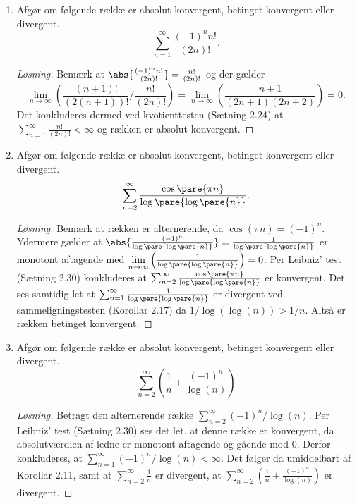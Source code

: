 \setcounter{section}{2}
\begin{opg}\hfill
\begin{enumerate}
    \item Afgør om følgende række er absolut konvergent, betinget konvergent eller divergent.
    $$ \sum_{n=1}^\infty \frac{(-1)^n n! }{(2n)!}. $$
    \ifanswers
    \begin{proof}[Løsning]
    	Bemærk at $ \abs{\frac{(-1)^n n! }{(2n)!}}=\frac{ n! }{(2n)!} $ og der gælder \begin{equation*}
    	\lim\limits_{n\to\infty}\left(\frac{ (n+1)! }{(2(n+1))!}\Bigg/\frac{ n! }{(2n)!}\right)=\lim\limits_{n\to\infty}\left(\frac{n+1}{(2n+1)(2n+2)}\right)=0.
    	\end{equation*}
    	Det konkluderes dermed ved kvotienttesten (Sætning 2.24) at $ \sum_{n=1}^\infty \frac{ n! }{(2n)!}<\infty $ og rækken er absolut konvergent.
    \end{proof}
    \fi
    
    \item Afgør om følgende række er absolut konvergent, betinget konvergent eller divergent.
    $$ \sum_{n=2}^\infty
        \frac{\cos\pare{\pi n}}{\log\pare{\log\pare{n}}}.  $$
        \ifanswers
        \begin{proof}[Løsning]
        	Bemærk at rækken er alternerende, da $ \cos(\pi n)=(-1)^n $.
        	Ydermere gælder at $ \abs{\frac{(-1)^n}{\log\pare{\log\pare{n}}}}=\frac{1}{\log\pare{\log\pare{n}}} $ er monotont aftagende med $\lim\limits_{n\to\infty}\left(\frac{1}{\log\pare{\log\pare{n}}}\right)= 0 $. Per Leibniz' test (Sætning 2.30) konkluderes at $ \sum_{n=2}^\infty
        	\frac{\cos\pare{\pi n}}{\log\pare{\log\pare{n}}} $ er konvergent. Det ses samtidig let at $ \sum_{n=1}^{\infty}\frac{1}{\log\pare{\log\pare{n}}} $ er divergent ved sammeligningstesten (Korollar 2.17) da $ 1/\log(\log(n))>1/n $. Altså er rækken betinget konvergent.
        \end{proof}
        \fi
    \item Afgør om følgende række er absolut konvergent, betinget konvergent eller divergent.
    $$
    \sum_{n=2}^{\infty}\left(\frac{1}{n}+\frac{(-1)^n}{\log(n)}\right)
    $$
    
    \ifanswers
    \begin{proof}[Løsning]
    	Betragt den alternerende række $ \sum_{n=2}^{\infty}(-1)^n/\log(n) $. Per Leibniz' test (Sætning 2.30) ses det let, at denne række er konvergent, da absolutværdien af ledne er monotont aftagende og gående mod $ 0 $. Derfor konkluderes, at $ \sum_{n=1}^{\infty}(-1)^n/\log(n)<\infty $. Det følger da umiddelbart af Korollar 2.11, samt at $ \sum_{n=2}^{\infty}\frac{1}{n} $ er divergent, at $ \sum_{n=2}^{\infty}\left(\frac{1}{n}+\frac{(-1)^n}{\log(n)}\right) $ er divergent.
    	

\end{proof}
\end{enumerate}
\end{opg}
